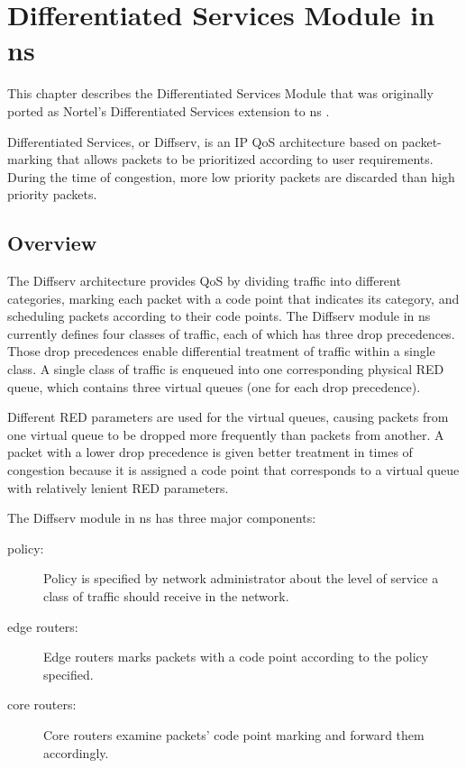 %
%
%
\chapter{Differentiated Services Module in ns}
\label{chap:diffserv}

This chapter describes the Differentiated Services Module that was originally 
ported as Nortel's Differentiated Services extension to ns \cite{Diffserv}.

Differentiated Services, or Diffserv, is an IP QoS architecture based on 
packet-marking that allows packets to be prioritized according to user 
requirements.  During the time of congestion, more low priority packets are 
discarded than high priority packets.

\section{Overview}
\label{sec:diffservoverview}

The Diffserv architecture provides QoS by dividing traffic into different 
categories, marking each packet with a code point that indicates its category, 
and scheduling packets according to their code points. The Diffserv module in 
ns currently defines four classes of traffic, each of which has three drop 
precedences.  Those drop precedences enable differential treatment of traffic 
within a single class. A single class of traffic is enqueued into one 
corresponding physical RED queue, which contains three virtual queues (one for
each drop precedence).

Different RED parameters are used for the virtual queues, causing packets from 
one virtual queue to be dropped more frequently than packets from another.  A 
packet with a lower drop precedence is given better treatment in times of 
congestion because it is assigned a code point that corresponds to a virtual 
queue with relatively lenient RED parameters.  

The Diffserv module in ns has three major components:
\begin{description}

\item [policy:]
Policy is specified by network administrator about the level of service a class
of traffic should receive in the network.  

\item [edge routers:]
Edge routers marks packets with a code point according to the policy specified.

\item [core routers:]
Core routers examine packets' code point marking and forward them accordingly.

\end{description}

